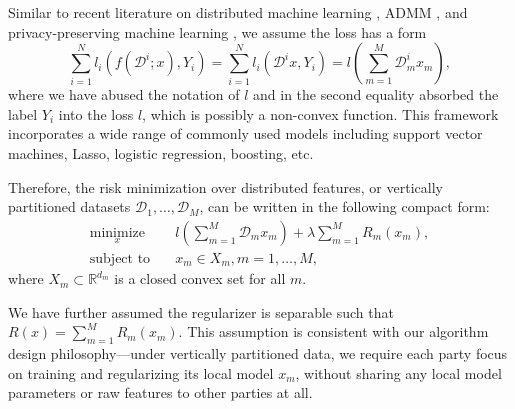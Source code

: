 Similar to recent literature on distributed machine learning \cite{ying2018supervised,zhou2016convergence}, ADMM \cite{zhang2016dual,zhang2018improving}, and privacy-preserving machine learning \cite{chaudhuri2011differentially,hamm2016learning}, we assume the loss has a form
\[
\sum_{i=1}^{N}l_i(f(\mathcal{D}^i; x), Y_i) = \sum_{i=1}^{N}l_i(\mathcal{D}^i x, Y_i)
=l\left(\sum_{m=1}^{M} \mathcal{D}_m^i x_m\right),
\]
where we have abused the notation of $l$ and in the second equality absorbed the label $Y_i$ into the loss $l$, which is possibly a non-convex function.
This framework incorporates a wide range of commonly used models including support vector machines, Lasso, logistic regression, boosting, etc.





Therefore, the risk minimization over distributed features, or vertically partitioned datasets $\mathcal D_1,\ldots,\mathcal D_M$, can be written in the following compact form:
\begin{align}
\underset{x}{\text{minimize}}&\quad l\left(\sum_{m=1}^{M} \mathcal{D}_mx_m\right) + \lambda\sum_{m=1}^{M} R_m(x_m), \label{eq:analysis_problem}\\
\text{subject to}&\quad x_m\in X_m, m=1,\ldots,M,
\end{align}
where  $X_m\subset\mathbb{R}^{d_m}$ is a closed convex set for all $m$.

We have further assumed the regularizer is separable such that
$R(x) = \sum_{m=1}^{M} R_m(x_m).$ This assumption is consistent with our algorithm design philosophy---under vertically partitioned data, we require each party focus on training and regularizing its local model $x_m$, without sharing any local model parameters or raw features to other parties at all. 